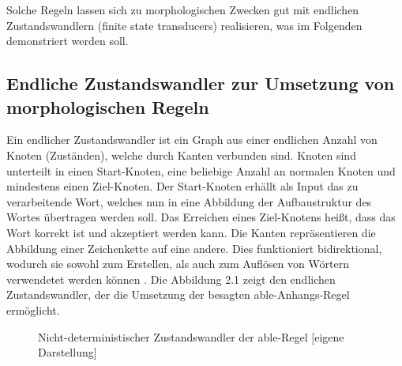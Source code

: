 \documentclass[12pt]{report}
\begin{document}
Solche Regeln lassen sich zu morphologischen Zwecken gut mit endlichen Zustandswandlern (finite state transducers) realisieren, was im Folgenden demonstriert werden soll.

\subsection{Endliche Zustandswandler zur Umsetzung von morphologischen Regeln}
Ein endlicher Zustandswandler ist ein Graph aus einer endlichen Anzahl von Knoten (Zuständen), welche durch Kanten verbunden sind. Knoten sind unterteilt in einen Start-Knoten, eine beliebige Anzahl an normalen Knoten und mindestens einen Ziel-Knoten. Der Start-Knoten erhällt als Input das zu verarbeitende Wort, welches nun in eine Abbildung der Aufbaustruktur des Wortes übertragen werden soll. Das Erreichen eines Ziel-Knotens heißt, dass das Wort korrekt ist und akzeptiert werden kann. Die Kanten repräsentieren die Abbildung einer Zeichenkette auf eine andere. Dies funktioniert bidirektional, wodurch sie sowohl zum Erstellen, als auch zum Auflösen von Wörtern verwendetet werden können \cite{cop04}. Die Abbildung 2.1 zeigt den endlichen Zustandswandler, der die Umsetzung der besagten \glqq  able\grqq{}-Anhangs-Regel ermöglicht.
\\

\begin{figure}[h!]
\begin{center}
\caption{Nicht-deterministischer Zustandswandler der able-Regel [eigene Darstellung]}
\end{center}
\end{figure}
\end{document}
